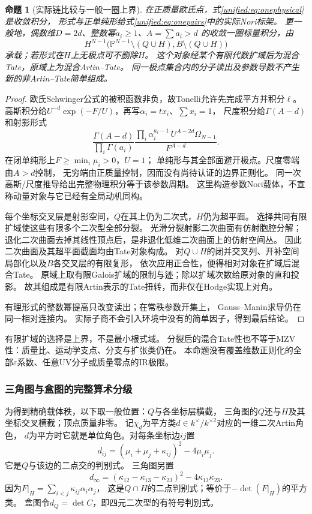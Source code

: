 \documentclass[11pt,a4paper,oneside]{ctexart}
\theoremstyle{cnplain}
\newtheorem{proposition}[theorem]{命题}
\theoremstyle{definition}
\theoremstyle{remark}
\numberwithin{equation}{section}
\begin{document}
\begin{proposition}[实际链比较与一般一圈上界]\label{unified:prop:onecarrier}
在正质量欧氏点，式\eqref{unified:eq:onephysical}是收敛积分，
形式与正单纯形给式\eqref{unified:eq:onepairs}中的实际Nori标架。
更一般地，偶数维$D=2d$、整数幂$a_i\ge1$、$A=\sum a_i>d$
的收敛一圈标量积分，由
\[
 H^{N-1}\bigl(\mathbb P^{N-1}\setminus(Q\cup H),
                    B\setminus(Q\cup H)\bigr)
\]
承载；若形式在$H$上无极点可不删除$H$。
这个对象经某个有限代数扩域后为混合Tate，原域上为混合Artin--Tate。
同一极点集合内的分子读出及参数导数不产生新的非Artin--Tate简单组成。
\end{proposition}
\begin{proof}
欧氏Schwinger公式的被积函数非负，故Tonelli允许先完成平方并积分$\ell$。
高斯积分给$U^{-d}\exp(-F/U)$，再写$\alpha_i=t x_i$、$\sum x_i=1$，
尺度积分给$\Gamma(A-d)$和射影形式
\[
 \frac{\Gamma(A-d)}{\prod_i\Gamma(a_i)}
 \frac{\prod_i\alpha_i^{a_i-1}\,U^{A-2d}\Omega_{N-1}}{F^{A-d}}.
\]
在闭单纯形上$F\ge\min_i\mu_i>0$，$U=1$；
单纯形与其全部面避开极点。尺度零端由$A>d$控制，
无穷端由正质量控制，因而没有尚待认证的边界正则化。
同一次高斯/尺度推导给出完整物理积分等于该参数周期。
这里构造参数Nori载体，不宣称动量对象与它已经有全局动机同构。

每个坐标交叉层是射影空间，$Q$在其上仍为二次式，$H$仍为超平面。
选择共同有限扩域使这些有限多个二次型全部分裂。
光滑分裂射影二次曲面有仿射胞腔分解；
退化二次曲面去掉其线性顶点后，是非退化低维二次曲面上的仿射空间丛。
因此二次曲面及其超平面截面均由Tate对象构成。
对$Q\cup H$的闭并交叉列、开补空间局部化以及$B$各交叉层的有限复形，
依次应用正合性，便得相对对象在扩域后混合Tate。
原域上取有限Galois扩域的限制与迹；除以扩域次数给原对象的直和投影。
故其组成是有限Artin表示的Tate扭转，而非仅在Hodge实现上对角。

有理形式的整数幂提高只改变读出；在常秩参数开集上，
Gauss--Manin求导仍在同一相对连接内。
实际子商不会引入环境中没有的简单因子，得到最后结论。
\end{proof}

有限扩域的选择是上界，不是最小根式域。
分裂后的混合Tate性也不等于MZV性：质量比、运动学支点、分支与扩张类仍在。
本命题没有覆盖维数正则化的全部$\varepsilon$系数、任意UV分子或质量零点的IR极限。

\subsubsection{三角图与盒图的完整算术分级}
为得到精确载体秩，以下取一般位置：$Q$与各坐标层横截，
三角图的$Q$还与$H$及其坐标交叉横截；顶点质量非零。
记$\chi_d$为平方类$d\in k^\times/k^{\times2}$对应的一维二次Artin角色，
$d$为平方时它就是单位角色。对每条坐标边$ij$置
\begin{equation}\label{unified:eq:edgedisc}
 d_{ij}=(\mu_i+\mu_j+\kappa_{ij})^2-4\mu_i\mu_j .
\end{equation}
它是$Q$与该边的二点交的判别式。
三角图另置
\[
 d_\infty=(\kappa_{12}-\kappa_{13}-\kappa_{23})^2
                          -4\kappa_{13}\kappa_{23}.
\]
因为$F|_H=\sum_{i<j}\kappa_{ij}\alpha_i\alpha_j$，
这是$Q\cap H$的二点判别式；等价于$-\det(F|_H)$的平方类。
盒图令$d_Q=\det C$，即四元二次型的有符号判别式。
\end{document}

